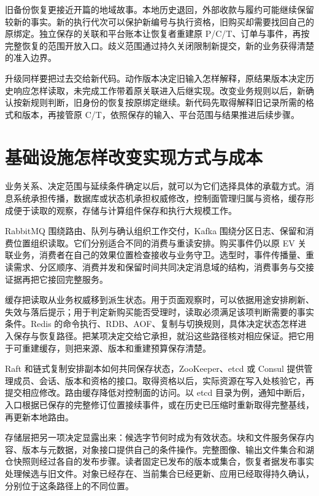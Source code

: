 旧备份恢复更接近开篇的地域故事。本地历史退回，外部收款与履约可能继续保留较新的事实。新的执行代次可以保护新编号与执行资格，旧购买却需要找回自己的原绑定。独立保存的关联和平台账本让恢复者重建原 P/C/T、订单与事件，再按完整恢复的范围开放入口。歧义范围通过持久关闭限制新提交，新的业务获得清楚的准入边界。

升级同样要把过去交给新代码。动作版本决定旧输入怎样解释，原结果版本决定历史响应怎样读取，未完成工作带着原关联进入后继实现。改变业务规则以后，新确认按新规则判断，旧身份的恢复按原绑定继续。新代码先取得解释旧记录所需的格式和版本，再接管原 C/T，依照保存的输入、平台范围与结果推进后续步骤。

\section*{基础设施怎样改变实现方式与成本}

业务关系、决定范围与延续条件确定以后，就可以为它们选择具体的承载方式。消息系统承担传播，数据库或状态机承担权威修改，控制面管理归属与资格，缓存形成便于读取的观察，存储与计算组件保存和执行大规模工作。

RabbitMQ 围绕路由、队列与确认组织工作交付，Kafka 围绕分区日志、保留和消费位置组织读取。它们分别适合不同的消费与重读安排。购买事件仍以原 EV 关联业务，消费者在自己的效果位置检查接收与业务守卫。选型时，事件传播量、重读需求、分区顺序、消费并发和保留时间共同决定消息域的结构，消费事务与交接证据再把它接回完整服务。

缓存把读取从业务权威移到派生状态。用于页面观察时，可以依据用途安排刷新、失效与落后提示；用于判定新购买能否受理时，读取必须满足该项判断需要的事实条件。Redis 的命令执行、RDB、AOF、复制与切换规则，具体决定状态怎样进入保存与恢复路径。把某项决定交给它承担，就沿这些路径核对相应保证。把它用于可重建缓存，则把来源、版本和重建预算保存清楚。

Raft 和链式复制安排副本如何共同保存状态，ZooKeeper、etcd 或 Consul 提供管理成员、会话、版本和资格的接口。取得资格以后，实际资源在写入处核验它，再提交相应修改。路由缓存降低对控制面的访问。以 etcd 目录为例，通知中断后，入口根据已保存的完整修订位置接续事件，或在历史已压缩时重新取得完整基线，再更新本地路由。

存储层把另一项决定显露出来：候选字节何时成为有效状态。块和文件服务保存内容、版本与元数据，对象接口提供自己的条件操作。完整图像、输出文件集合和湖仓快照则经过各自的发布步骤。读者固定已发布的版本或集合，恢复者据发布事实处理候选与旧文件。对象已经存在、当前集合已经更新、应用已经取得持久确认，分别位于这条路径上的不同位置。

